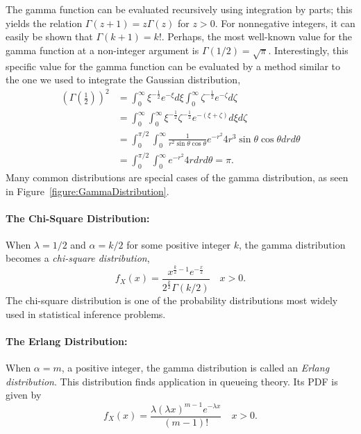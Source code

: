 The gamma function can be evaluated recursively using integration by parts; this yields the relation $\Gamma (z+1) = z \Gamma (z)$ for $z > 0$.
For nonnegative integers, it can easily be shown that $\Gamma (k + 1) = k!$.
Perhaps, the most well-known value for the gamma function at a non-integer argument is $\Gamma ( 1/2 ) = \sqrt{\pi}$.
Interestingly, this specific value for the gamma function can be evaluated by a method similar to the one we used to integrate the Gaussian distribution,
\begin{equation*}
\begin{split}
\left( \Gamma \left( \frac{1}{2} \right) \right)^2
&= \int_0^{\infty} \xi^{-\frac{1}{2}} e^{-\xi} d\xi
\int_0^{\infty} \zeta^{-\frac{1}{2}} e^{-\zeta} d\zeta \\
&= \int_0^{\infty} \int_0^{\infty}
\xi^{-\frac{1}{2}} \zeta^{-\frac{1}{2}} e^{-(\xi + \zeta)}
d\xi d\zeta \\
&= \int_0^{\pi / 2} \int_0^{\infty}
\frac{1}{r^2 \sin \theta \cos \theta} e^{-r^2}
4 r^3 \sin \theta \cos \theta dr d\theta \\
&= \int_0^{\pi / 2} \int_0^{\infty}
 e^{-r^2} 4 r dr d\theta
= \pi .
\end{split}
\end{equation*}
Many common distributions are special cases of the gamma distribution, as seen in Figure~\ref{figure:GammaDistribution}.


\paragraph{The Chi-Square Distribution:}
When $\lambda = 1/2$ and $\alpha = k/2$ for some positive integer $k$, the gamma distribution becomes a \emph{chi-square distribution},
\begin{equation*}
f_X (x) = \frac{x^{\frac{k}{2} - 1} e^{-\frac{x}{2}}}{2^{\frac{k}{2}}\Gamma (k/2)} \quad  x > 0.
\end{equation*}
The chi-square distribution is one of the probability distributions most widely used in statistical inference problems.


\paragraph{The Erlang Distribution:}
When $\alpha = m$, a positive integer, the gamma distribution is called an \emph{Erlang distribution}.
This distribution finds application in queueing theory.
Its PDF is given by
\begin{equation*}
f_X (x) = \frac{\lambda (\lambda x)^{m - 1} e^{-\lambda x}}{(m-1)!} \quad  x > 0.
\end{equation*}

